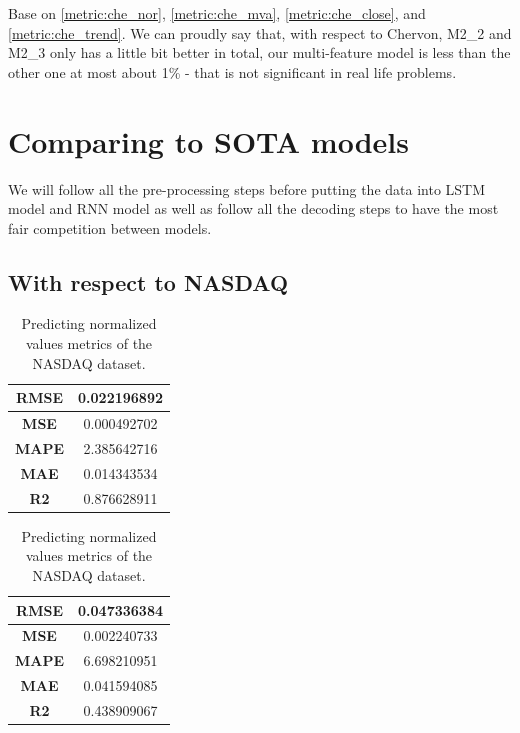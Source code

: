 Base on \autoref{metric:che_nor}, \autoref{metric:che_mva}, \autoref{metric:che_close},
and \autoref{metric:che_trend}. We can proudly say that, with respect to Chervon,
M2\_2 and M2\_3 only has a little bit better in total, our multi-feature model is less than the other one at most about 1\% - that is not significant in real life problems.

\section{Comparing to SOTA models}
We will follow all the pre-processing steps before putting the data into LSTM model
and RNN model as well as follow all the decoding steps to have the most fair competition
between models.

\subsection{With respect to NASDAQ}
\begin{table}[H]
	\centering
	\begin{minipage}{0.4\textwidth}
		\centering
		\begin{tabular}{|c|c|}
			\hline
			\textbf{RMSE} & 0.022196892 \\
			\hline
			\textbf{MSE}  & 0.000492702 \\
			\hline
			\textbf{MAPE} & 2.385642716 \\
			\hline
			\textbf{MAE}  & 0.014343534 \\
			\hline
			\textbf{R2}   & 0.876628911 \\
			\hline
		\end{tabular}
	\end{minipage}
	\begin{minipage}{0.4\textwidth}
		\centering
		\begin{tabular}{|c|c|}
			\hline
			\textbf{RMSE} & 0.047336384
			 \\
			\hline
			\textbf{MSE}  & 0.002240733
			 \\
			\hline
			\textbf{MAPE} & 6.698210951
			 \\
			\hline
			\textbf{MAE}  & 0.041594085
			 \\
			\hline
			\textbf{R2}   & 0.438909067
			 \\
			\hline
		\end{tabular}
	\end{minipage}
	\caption{Predicting normalized values metrics of the NASDAQ dataset.}
	\label{nas:lstm_rnn_nor}
\end{table}
